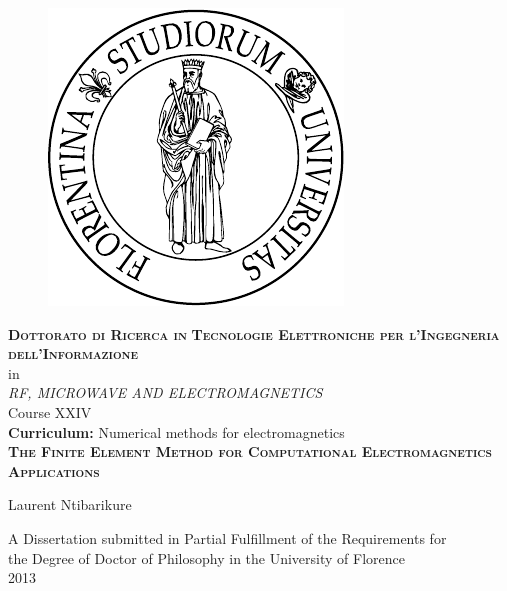 \graphicspath{{img/}}
\thispagestyle{empty}


\begin{figure}[htbp]
\centering
\includegraphics[scale=0.5]{UniFI}
\label{fig:UniFI}
\end{figure}
\begin{center} 
\vspace{-5pt}
\textbf{\textsc{Dottorato di Ricerca in}}
\textbf{\textsc{Tecnologie Elettroniche per l'Ingegneria dell'Informazione}}
\mat\\[5pt]
in\\[5pt]
\emph{RF, MICROWAVE AND ELECTROMAGNETICS}\\[5pt]
Course XXIV\\[5pt]
\textbf{Curriculum:} Numerical methods for electromagnetics\\[5pt]



\vspace{40pt} 
\textsc{
\Large \textbf {The Finite Element Method for Computational Electromagnetics Applications}
}

\vspace{30pt}
\normalsize{
Laurent Ntibarikure\\}

\vspace{30pt} 

A Dissertation submitted in Partial Fulfillment of the Requirements for\\
the Degree of Doctor of Philosophy in the University of Florence\\
2013

\end{center}


